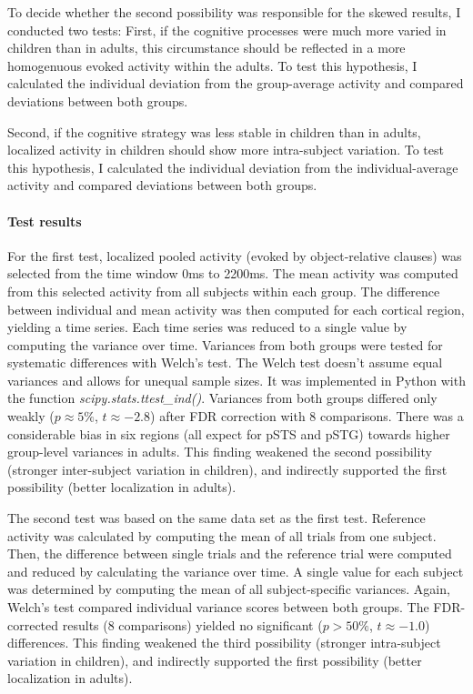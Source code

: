 To decide whether the second possibility was responsible for the skewed results, I conducted two tests:
First, if the cognitive processes were much more varied in children than in adults, this circumstance should be reflected in a more homogenuous evoked activity within the adults.
To test this hypothesis, I calculated the individual deviation from the group-average activity and compared deviations between both groups.

Second, if the cognitive strategy was less stable in children than in adults, localized activity in children should show more intra-subject variation.
To test this hypothesis, I calculated the individual deviation from the individual-average activity and compared deviations between both groups.

\paragraph{Test results}
For the first test, localized pooled activity (evoked by object-relative clauses) was selected from the time window 0ms to 2200ms.
The mean activity was computed from this selected activity from all subjects within each group.
The difference between individual and mean activity was then computed for each cortical region, yielding a time series.
Each time series was reduced to a single value by computing the variance over time.
Variances from both groups were tested for systematic differences with Welch's test.
The Welch test doesn't assume equal variances and allows for unequal sample sizes.
It was implemented in Python with the function \emph{scipy.stats.ttest\_ind()}.
Variances from both groups differed only weakly ($p \approx 5\%$, $t \approx -2.8$) after FDR correction with 8 comparisons.
There was a considerable bias in six regions (all expect for pSTS and pSTG) towards higher group-level variances in adults.
This finding weakened the second possibility (stronger inter-subject variation in children), and indirectly supported the first possibility (better localization in adults).

The second test was based on the same data set as the first test.
Reference activity was calculated by computing the mean of all trials from one subject.
Then, the difference between single trials and the reference trial were computed and reduced by calculating the variance over time.
A single value for each subject was determined by computing the mean of all subject-specific variances.
Again, Welch's test compared individual variance scores between both groups.
The FDR-corrected results (8 comparisons) yielded no significant ($p > 50\%$, $t \approx -1.0$) differences.
This finding weakened the third possibility (stronger intra-subject variation in children), and indirectly supported the first possibility (better localization in adults).

